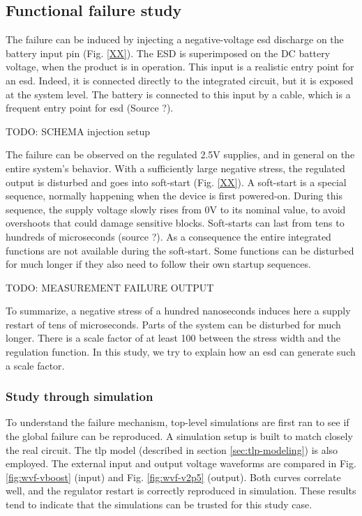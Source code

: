 \subsection{Functional failure study}
\label{sec:failure-case-study}

The failure can be induced by injecting a negative-voltage \gls{esd} discharge on the battery input pin (Fig. \ref{XX}).
The \gls{ESD} is superimposed on the DC battery voltage, when the product is in operation.
This input is a realistic entry point for an \gls{esd}.
Indeed, it is connected directly to the integrated circuit, but it is exposed at the system level.
The battery is connected to this input by a cable, which is a frequent entry point for \gls{esd} (Source ?).

TODO: SCHEMA injection setup

The failure can be observed on the regulated 2.5V supplies, and in general on the entire system's behavior.
With a sufficiently large negative stress, the regulated output is disturbed and goes into soft-start (Fig. \ref{XX}).
A soft-start is a special sequence, normally happening when the device is first powered-on.
During this sequence, the supply voltage slowly rises from 0V to its nominal value, to avoid overshoots that could damage sensitive blocks.
Soft-starts can last from tens to hundreds of microseconds (source ?).
As a consequence the entire integrated functions are not available during the soft-start.
Some functions can be disturbed for much longer if they also need to follow their own startup sequences.

TODO: MEASUREMENT FAILURE OUTPUT

To summarize, a negative stress of a hundred nanoseconds induces here a supply restart of tens of microseconds.
Parts of the system can be disturbed for much longer.
There is a scale factor of at least 100 between the stress width and the regulation function.
In this study, we try to explain how an \gls{esd} can generate such a scale factor.

\subsubsection{Study through simulation}

To understand the failure mechanism, top-level simulations are first ran to see if the global failure can be reproduced.
A simulation setup is built to match closely the real circuit.
The \gls{tlp} model (described in section \ref{sec:tlp-modeling}) is also employed.
The external input and output voltage waveforms are compared in Fig. \ref{fig:wvf-vboost} (input) and Fig. \ref{fig:wvf-v2p5} (output).
Both curves correlate well, and the regulator restart is correctly reproduced in simulation.
These results tend to indicate that the simulations can be trusted for this study case.

